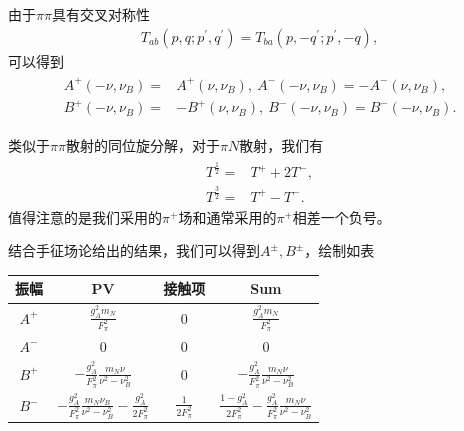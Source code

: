 \documentclass[aps,tightenlines,16pt]{ctexart}
\numberwithin{equation}{section}
\begin{document}
由于$\pi\pi$具有交叉对称性
\begin{align}
   T_{ab}(p,q;p^{\prime},q^{\prime})=T_{ba}(p,-q^{\prime};p^{\prime},-q),
\end{align}
可以得到
\begin{align}
   \begin{aligned}
      A^+(-\nu,\nu_B)=&A^+(\nu,\nu_B),\ A^-(-\nu,\nu_B)=-A^-(\nu,\nu_B),\\
      B^+(-\nu,\nu_B)=&-B^+(\nu,\nu_B),\ B^-(-\nu,\nu_B)=B^-(-\nu,\nu_B).
   \end{aligned}
\end{align}

类似于$\pi\pi$散射的同位旋分解，对于$\pi N$散射，我们有
\begin{align}
   \begin{aligned}
   T^{\frac{1}{2}}=&T^++2T^-,\\
   T^{\frac{3}{2}}=&T^+-T^-.
   \end{aligned}
\end{align}
值得注意的是我们采用的$\pi^+$场和通常采用的$\pi^+$相差一个负号。

结合手征场论给出的结果，我们可以得到$A^{\pm},B^{\pm}$，绘制如表
\begin{table}[h]
   \centering
   \begin{tabular}{cccc}
      \toprule
      振幅&PV&接触项&Sum\\
      \midrule
      $A^+$&$\frac{g_A^2m_N}{F_{\pi}^2}$&0&$\frac{g_A^2m_N}{F_{\pi}^2}$\\
      $A^-$&0&0&0\\
      $B^+$&$-\frac{g_A^2}{F_{\pi}^2}\frac{m_N\nu}{\nu^2-\nu_B^2}$&0&$-\frac{g_A^2}{F_{\pi}^2}\frac{m_N\nu}{\nu^2-\nu_B^2}$\\
      $B^-$&$-\frac{g_A^2}{F_{\pi}^2}\frac{m_N\nu_B}{\nu^2-\nu_B^2}-\frac{g_A^2}{2F_{\pi}^2}$&$\frac{1}{2F_{\pi}^2}$&$\frac{1-g_A^2}{2F_{\pi}^2}-\frac{g_A^2}{F_{\pi}^2}\frac{m_N\nu}{\nu^2-\nu_B^2}$\\
      \bottomrule
   \end{tabular}
\end{table}
\end{document}
